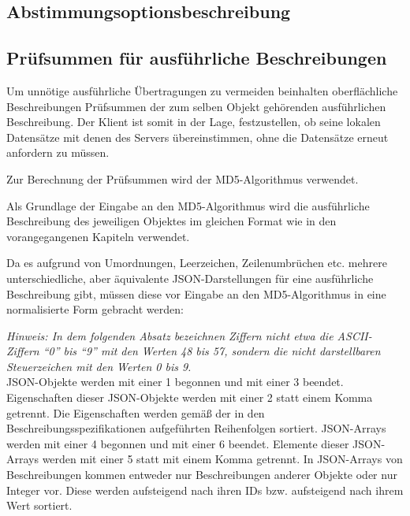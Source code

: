\documentclass[parskip=full,11pt]{scrartcl}
\begin{document}
\subsection{Abstimmungsoptionsbeschreibung}\label{sec:polloptiondesc}

\subsection{Prüfsummen für ausführliche Beschreibungen}\label{sec:checksum}
\newcommand{\hashAlg}{MD5}
Um unnötige ausführliche Übertragungen zu vermeiden beinhalten oberflächliche
Beschreibungen Prüfsummen der zum selben Objekt gehörenden ausführlichen
Beschreibung.
Der Klient ist somit in der Lage, festzustellen, ob seine lokalen Datensätze
mit denen des Servers übereinstimmen, ohne die Datensätze erneut anfordern zu
müssen.

\par Zur Berechnung der Prüfsummen wird der \hashAlg-Algorithmus verwendet.

\par Als Grundlage der Eingabe an den \hashAlg-Algorithmus wird die
ausführliche Beschreibung des jeweiligen Objektes im gleichen Format wie in den
vorangegangenen Kapiteln verwendet.

\par Da es aufgrund von Umordnungen, Leerzeichen, Zeilenumbrüchen etc. mehrere
unterschiedliche, aber äquivalente JSON-Darstellungen für eine ausführliche
Beschreibung gibt, müssen diese vor Eingabe an den \hashAlg-Algorithmus in eine
normalisierte Form gebracht werden:

\par \textit{Hinweis: In dem folgenden Absatz bezeichnen Ziffern nicht etwa die
ASCII-Ziffern \enquote{0} bis \enquote{9} mit den Werten 48 bis 57, sondern die
nicht darstellbaren Steuerzeichen mit den Werten 0 bis 9.}\\
JSON-Objekte werden mit einer 1 begonnen und mit einer 3 beendet.
Eigenschaften dieser JSON-Objekte werden mit einer 2 statt einem Komma
getrennt.
Die Eigenschaften werden gemäß der in den Beschreibungsspezifikationen
aufgeführten Reihenfolgen sortiert.
JSON-Arrays werden mit einer 4 begonnen und mit einer 6 beendet.
Elemente dieser JSON-Arrays werden mit einer 5 statt mit einem Komma getrennt.
In JSON-Arrays von Beschreibungen kommen entweder nur Beschreibungen anderer
Objekte oder nur Integer vor.
Diese werden aufsteigend nach ihren IDs bzw. aufsteigend nach ihrem Wert
sortiert.
\end{document}
